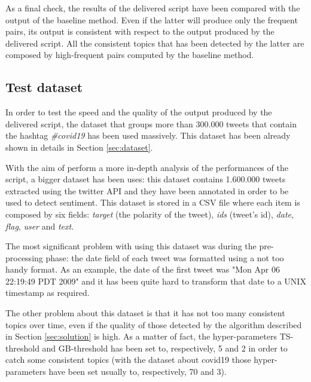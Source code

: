 As a final check, the results of the delivered script have been compared with the output of the baseline method. Even if the latter will produce only the frequent pairs, its output is consistent with respect to the output produced by the delivered script. All the consistent topics that has been detected by the latter are composed by high-frequent pairs computed by the baseline method.

\subsection{Test dataset}
\label{subsec:test_dataset}
In order to test the speed and the quality of the output produced by the delivered script, the dataset that groups more than 300.000 tweets that contain the hashtag \textit{\#covid19} \cite{covid19-tweets-dataset} has been used massively. This dataset has been already shown in details in Section \ref{sec:dataset}.

With the aim of perform a more in-depth analysis of the performances of the script, a bigger dataset has been uses: this dataset \cite{sentiment-analysis-dataset} contains 1.600.000 tweets extracted using the twitter API and they have been annotated in order to be used to detect sentiment. This dataset is stored in a CSV file where each item is composed by six fields: \textit{target} (the polarity of the tweet), \textit{ids} (tweet's id), \textit{date}, \textit{flag}, \textit{user} and \textit{text}. 

The most significant problem with using this dataset was during the pre-processing phase: the date field of each tweet was formatted using a not too handy format. As an example, the date of the first tweet was "Mon Apr 06 22:19:49 PDT 2009" and it has been quite hard to transform that date to a UNIX timestamp as required.

The other problem about this dataset is that it has not too many consistent topics over time, even if the quality of those detected by the algorithm described in Section \ref{sec:solution} is high. As a matter of fact, the hyper-parameters TS-threshold and GB-threshold has been set to, respectively, 5 and 2 in order to catch some consistent topics (with the dataset about covid19 \cite{covid19-tweets-dataset} those hyper-parameters have been set usually to, respectively, 70 and 3). 